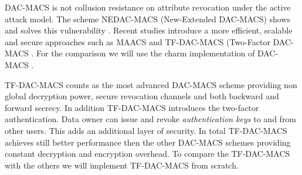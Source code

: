\ac{DAC-MACS} is not collusion resistance on attribute revocation under the active attack model. The scheme \ac{NEDAC-MACS} (New-Extended \ac{DAC-MACS}) shows and solves this vulnerability \cite{wu2017security}. Recent studies introduce a more efficient, scalable and secure approaches such as \ac{MAACS} \cite{li2016secure} and \ac{TF-DAC-MACS} (Two-Factor \ac{DAC-MACS} \cite{li2017two}. 
For the comparison we will use the charm implementation of DAC-MACS \cite{yang2013dac}.

\ac{TF-DAC-MACS} counts as the most advanced \ac{DAC-MACS} scheme providing non global decryption power, secure revocation channels and both backward and forward secrecy. In addition \ac{TF-DAC-MACS} introduces the two-factor authentication. Data owner can issue and revoke \textit{authentication keys} to and from other users. This adds an additional layer of security. In total \ac{TF-DAC-MACS} achieves still better performance then the other \ac{DAC-MACS} schemes providing constant decryption and encryption overhead. 
To compare the TF-DAC-MACS with the others we will implement TF-DAC-MACS from scratch. 

